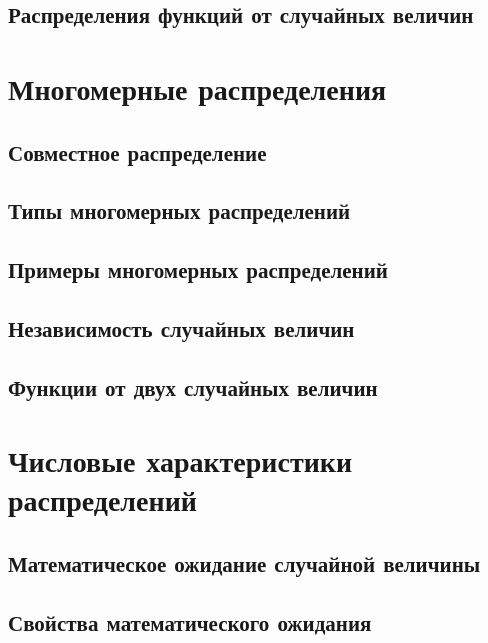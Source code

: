 \subsection{Распределения функций от случайных величин}






\section{\xmark Многомерные распределения}


\subsection{Совместное распределение}


\subsection{Типы многомерных распределений}


\subsection{Примеры многомерных распределений}




\subsection{Независимость случайных величин}


\subsection{Функции от двух случайных величин}



\section{Числовые характеристики распределений}

\subsection{Математическое ожидание случайной величины}


\subsection{Свойства математического ожидания}


